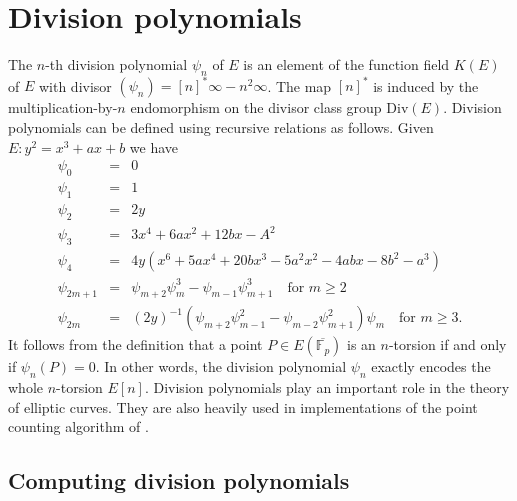 \documentclass[12pt]{article}
\theoremstyle{plain}
\theoremstyle{definition}
\def\F{\ensuremath{\mathbb{F}}}
\begin{document}


\section{Division polynomials}
\label{sec:divpoly}

The $n$-th division polynomial $\psi_n$ of $E$ is an element of the function field $K(E)$ of $E$ 
with divisor $(\psi_n) = [n]^*\infty - n^2\infty$. The map $[n]^*$ is induced by the 
multiplication-by-$n$ endomorphism on the divisor class group $\text{Div}(E)$. Division polynomials 
can be defined using recursive relations as follows. Given $E: y^2 = x^3 + ax + b$ we have
\begin{equation}
\label{equ:divpoly1}
	\begin{array}{rll}
		\psi_0 & = & 0 \\
		\psi_1 & = & 1 \\
		\psi_2 & = & 2y \\
		\psi_3 & = & 3x^4 + 6ax^2 + 12bx - A^2 \\
		\psi_4 & = & 4y(x^6 + 5ax^4 + 20bx^3 - 5a^2x^2 - 4abx - 8b^2 - a^3) \\
		\psi_{2m + 1} & = & \psi_{m + 2}\psi_m^3 - \psi_{m - 1}\psi_{m + 1}^3 \quad \text{for } m 
		\ge 2 \\
		\psi_{2m} & = & (2y)^{-1}(\psi_{m + 2}\psi_{m - 1}^2 - \psi_{m - 2}\psi_{m + 1}^2)\psi_m 
		\quad \text{for } m \ge 3.
	\end{array}
\end{equation}
It follows from the definition that a point $P \in E(\overline{\F_p})$ is an $n$-torsion if and 
only if $\psi_n(P) = 0$. In other words, the division polynomial $\psi_n$ exactly encodes the whole 
$n$-torsion $E[n]$. Division polynomials play an important role in the theory of elliptic 
curves. They are also heavily used in implementations of the point counting algorithm of 
\cite{schoof85}. 


\subsection{Computing division polynomials}
\end{document}

